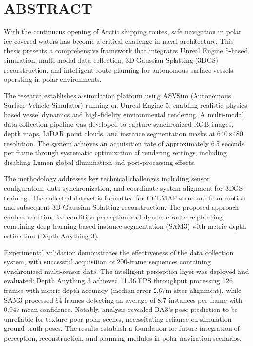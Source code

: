 
\clearpage
\section*{ABSTRACT}

With the continuous opening of Arctic shipping routes, safe navigation in polar ice-covered waters has become a critical challenge in naval architecture. This thesis presents a comprehensive framework that integrates Unreal Engine 5-based simulation, multi-modal data collection, 3D Gaussian Splatting (3DGS) reconstruction, and intelligent route planning for autonomous surface vessels operating in polar environments.

The research establishes a simulation platform using ASVSim (Autonomous Surface Vehicle Simulator) running on Unreal Engine 5, enabling realistic physics-based vessel dynamics and high-fidelity environmental rendering. A multi-modal data collection pipeline was developed to capture synchronized RGB images, depth maps, LiDAR point clouds, and instance segmentation masks at 640$\times$480 resolution. The system achieves an acquisition rate of approximately 6.5 seconds per frame through systematic optimization of rendering settings, including disabling Lumen global illumination and post-processing effects.

The methodology addresses key technical challenges including sensor configuration, data synchronization, and coordinate system alignment for 3DGS training. The collected dataset is formatted for COLMAP structure-from-motion and subsequent 3D Gaussian Splatting reconstruction. The proposed approach enables real-time ice condition perception and dynamic route re-planning, combining deep learning-based instance segmentation (SAM3) with metric depth estimation (Depth Anything 3).

Experimental validation demonstrates the effectiveness of the data collection system, with successful acquisition of 200-frame sequences containing synchronized multi-sensor data. The intelligent perception layer was deployed and evaluated: Depth Anything 3 achieved 11.36 FPS throughput processing 126 frames with metric depth accuracy (median error 2.67m after alignment), while SAM3 processed 94 frames detecting an average of 8.7 instances per frame with 0.947 mean confidence. Notably, analysis revealed DA3's pose prediction to be unreliable for texture-poor polar scenes, necessitating reliance on simulation ground truth poses. The results establish a foundation for future integration of perception, reconstruction, and planning modules in polar navigation scenarios.

